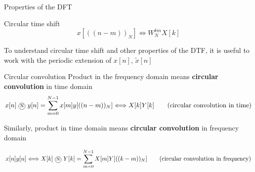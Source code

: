 \documentclass[10pt, handout]{beamer}
\begin{document}
%
\begin{frame}{Properties of the DFT}
	\centering
\end{frame}

%
\begin{frame}{Circular time shift}
\begin{equation*}
	x[((n-m))_N] \Longleftrightarrow W_N^{km}X[k] \tag{circular time shift}
\end{equation*}

To understand circular time shift and other properties of the DTF, it is useful to work with the periodic extension of $x[n]$, $\tilde{x}[n]$

\begin{center}
	\resizebox{\textwidth}{!}{}
\end{center}
\end{frame}

%
\begin{frame}{Circular convolution}
	Product in the frequency domain means \textbf{circular convolution} in time domain
	\begin{equation*}
		x[n]~\encircle{N}~y[n] = \sum_{m=0}^{N-1} x[m]y[((n-m))_N] \Longleftrightarrow X[k]Y[k] \tag{circular convolution in time}
	\end{equation*}
	
	Similarly, product in time domain means \textbf{circular convolution} in frequency domain
	
	\begin{equation*}
	x[n]y[n] \Longleftrightarrow X[k]~\encircle{N}~Y[k] = \sum_{m=0}^{N-1} X[m]Y[((k-m))_N] \tag{circular convolution in frequency}
	\end{equation*}
\end{frame}
\end{document}
